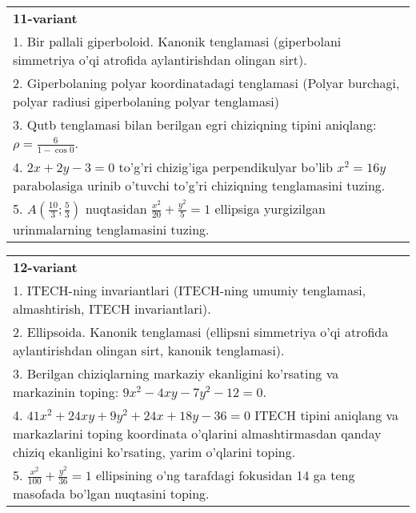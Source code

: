 \documentclass{article}
\begin{document}
\begin{tabular}{m{17cm}}
\textbf{11-variant}\\
1. Bir pallali giperboloid. Kanonik tenglamasi (giperbolani simmetriya o'qi atrofida aylantirishdan olingan sirt).\\

2. Giperbolaning polyar koordinatadagi tenglamasi (Polyar burchagi, polyar radiusi giperbolaning polyar tenglamasi)\\

3. Qutb tenglamasi bilan berilgan egri chiziqning tipini aniqlang: $\rho=\frac{6}{1-\cos 0}$.\\

4. $2x + 2y - 3 = 0$ to'g'ri chizig'iga perpendikulyar bo'lib $x^{2} = 16y$ parabolasiga urinib o'tuvchi to'g'ri chiziqning tenglamasini tuzing.  \\

5. $A(\frac{10}{3};\frac{5}{3})$ nuqtasidan $\frac{x^{2}}{20} + \frac{y^{2}}{5} = 1$ ellipsiga yurgizilgan urinmalarning tenglamasini tuzing.  
\end{tabular}
\vspace{1cm}


\begin{tabular}{m{17cm}}
\textbf{12-variant}\\
1. ITECH-ning invariantlari (ITECH-ning umumiy tenglamasi, almashtirish, ITECH invariantlari).\\

2. Ellipsoida. Kanonik tenglamasi (ellipsni simmetriya o'qi atrofida aylantirishdan olingan sirt, kanonik tenglamasi).\\

3. Berilgan chiziqlarning markaziy ekanligini ko'rsating va markazinin toping: $9x^{2}-4xy-7y^{2}-12=0$.\\

4. $41x^{2} + 24xy + 9y^{2} + 24x + 18y - 36 = 0$ ITECH tipini aniqlang va markazlarini toping koordinata o'qlarini almashtirmasdan qanday chiziq ekanligini ko'rsating, yarim o'qlarini toping.  \\

5. $\frac{x^{2}}{100} + \frac{y^{2}}{36} = 1$ ellipsining o'ng tarafdagi fokusidan 14 ga teng masofada bo'lgan nuqtasini toping.  
\end{tabular}
\vspace{1cm}
\end{document}
